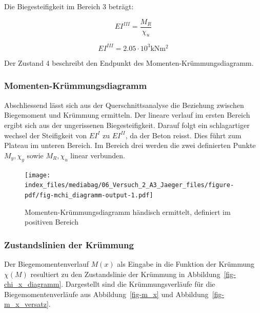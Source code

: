 \documentclass[
  letterpaper,
]{scrreprt}
\begin{document}
Die Biegesteifigkeit im Bereich 3 beträgt:

\begin{equation}EI^{III} = \frac{M_{R}}{\chi_{u}}\end{equation}

\begin{equation}EI^{III} = 2.05 \cdot 10^{3} \text{kN} \text{m}^{2}\end{equation}

Der Zustand 4 beschreibt den Endpunkt des Momenten-Krümmungsdiagramm.

\hypertarget{momenten-kruxfcmmungsdiagramm-1}{%
\subsubsection{Momenten-Krümmungsdiagramm}\label{momenten-kruxfcmmungsdiagramm-1}}

Abschliessend lässt sich aus der Querschnittsanalyse die Beziehung
zwischen Biegemoment und Krümmung ermitteln. Der lineare verlauf im
ersten Bereich ergibt sich aus der ungerissenen Biegesteifigkeit. Darauf
folgt ein schlagartiger wechsel der Steifigkeit von \(EI^I\) zu
\(EI^{II}\), da der Beton reisst. Dies führt zum Plateau im unteren
Bereich. Im Bereich drei werden die zwei definierten Punkte
\(M_y, \chi_y\) sowie \(M_R, \chi_u\) linear verbunden.

\begin{figure}[H]

{\centering \texttt{[image: index\_files/mediabag/06\_Versuch\_2\_A3\_Jaeger\_files/figure-pdf/fig-mchi\_diagramm-output-1.pdf]}

}

\caption{\label{fig-mchi_diagramm}Momenten-Krümmungsdiagramm händisch
ermittelt, definiert im positiven Bereich}

\end{figure}

\hypertarget{zustandslinien-der-kruxfcmmung}{%
\subsubsection{Zustandslinien der
Krümmung}\label{zustandslinien-der-kruxfcmmung}}

Der Biegemomentenverlauf \(M(x)\) als Eingabe in die Funktion der
Krümmung \(\chi(M)\) resultiert zu den Zustandslinie der Krümmung in
Abbildung~\ref{fig-chi_x_diagramm}. Dargestellt sind die
Krümmungsverläufe für die Biegemomentenverläufe aus
Abbildung~\ref{fig-m_x} und Abbildung~\ref{fig-m_x_versatz}.
\end{document}
